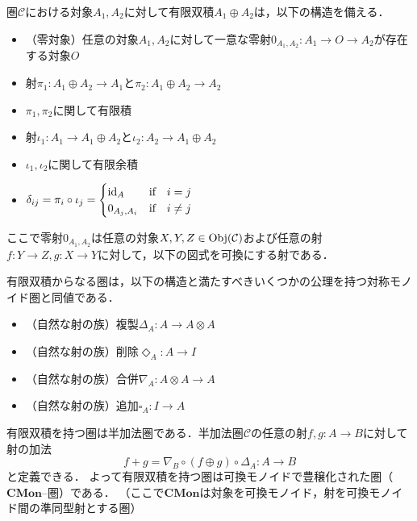 \documentclass[type_judgement.tex]{subfiles}
\begin{document}
\begin{defn}
圏$\mathcal{C}$における対象$A_1,A_2$に対して有限双積$A_1 \oplus A_2$は，以下の構造を備える．
\begin{itemize}
    \item （零対象）任意の対象$A_1,A_2$に対して一意な零射$0_{A_1,A_2}:A_1 \rightarrow O \rightarrow A_2$が存在する対象$O$
    \item 射$\pi_1:A_1 \oplus A_2 \rightarrow A_1$と$\pi_2:A_1 \oplus A_2 \rightarrow A_2$
    \item $\pi_1,\pi_2$に関して有限積
    \item 射$\iota_1:A_1 \rightarrow A_1 \oplus A_2$と$\iota_2:A_2 \rightarrow A_1 \oplus A_2$
    \item$\iota_1,\iota_2$に関して有限余積
    \item
    $
    \delta_{ij} = \pi_i \circ \iota_j =
        \begin{cases}
            \mathop{\mathrm{id}}\nolimits_A        & \text{if}\quad i = j \\
            0_{A_j,A_i} & \text{if}\quad i \neq j
        \end{cases}
    $
\end{itemize}
ここで零射$0_{A_1,A_2}$は任意の対象$X,Y,Z\in \mathop{\mathrm{Obj}}\nolimits(\mathcal{C})$および任意の射$f:Y \rightarrow Z, g:X \rightarrow Y$に対して，以下の図式を可換にする射である．
\begin{center}
\end{center}
\end{defn}

有限双積からなる圏は，以下の構造と満たすべきいくつかの公理\cite{selinger09}を持つ対称モノイド圏と同値である．
\begin{itemize}
    \item （自然な射の族）複製$\Delta_A:A \rightarrow A \otimes A$
    \item （自然な射の族）削除$\Diamond_A:A \rightarrow I$
    \item （自然な射の族）合併$\nabla_A:A \otimes A \rightarrow A$
    \item （自然な射の族）追加$\square_A:I \rightarrow A$
\end{itemize}

有限双積を持つ圏は半加法圏\cite{LACK2012593}である．半加法圏$\mathcal{C}$の任意の射$f,g:A \rightarrow B$に対して射の加法
\begin{equation*}
    f+g = \nabla_B \circ (f \oplus g) \circ \Delta_A:A \rightarrow B
\end{equation*}
と定義できる\cite{maclane1950duality}．
よって有限双積を持つ圏は可換モノイドで豊穣化された圏（$\mathbf{CMon}$--圏）である\cite[Def. 2.7.6]{giles_investigation_2014}．
（ここで$\mathbf{CMon}$は対象を可換モノイド，射を可換モノイド間の準同型射とする圏）
\end{document}
